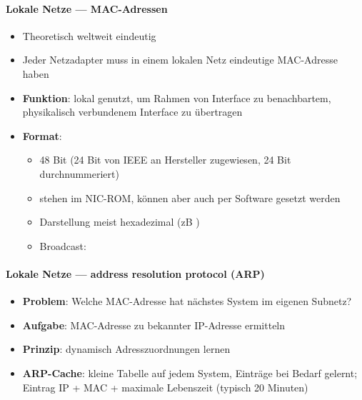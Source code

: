 \paragraph{Lokale Netze --- MAC-Adressen}
\begin{itemize}
  \item Theoretisch weltweit eindeutig
  \item Jeder Netzadapter muss in einem lokalen Netz eindeutige MAC-Adresse haben
  \item \textbf{Funktion}: lokal genutzt, um Rahmen von Interface zu benachbartem, physikalisch verbundenem Interface zu übertragen
  \item \textbf{Format}:
  \begin{itemize}
    \item 48 Bit (24 Bit von IEEE an Hersteller zugewiesen, 24 Bit durchnummeriert)
    \item stehen im NIC-ROM, können aber auch per Software gesetzt werden
    \item Darstellung meist hexadezimal (zB )
    \item Broadcast: 
  \end{itemize}
\end{itemize}

\paragraph{Lokale Netze --- address resolution protocol (ARP)}
\begin{itemize}
  \item \textbf{Problem}: Welche MAC-Adresse hat nächstes System im eigenen Subnetz?
  \item \textbf{Aufgabe}: MAC-Adresse zu bekannter IP-Adresse ermitteln
  \item \textbf{Prinzip}: dynamisch Adresszuordnungen lernen
  \item \textbf{ARP-Cache}: kleine Tabelle auf jedem System, Einträge bei Bedarf gelernt; Eintrag IP + MAC + maximale Lebenszeit (typisch 20 Minuten) 
\end{itemize}

